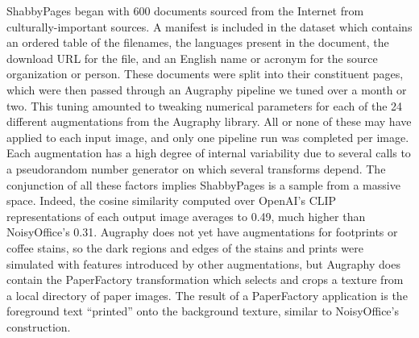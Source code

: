 \documentclass[runningheads]{llncs}
\begin{document}
ShabbyPages began with 600 documents sourced from the Internet from culturally-important sources.
A manifest is included in the dataset which contains an ordered table of the filenames, the languages present in the document, the download URL for the file, and an English name or acronym for the source organization or person.
These documents were split into their constituent pages, which were then passed through an Augraphy pipeline we tuned over a month or two.
This tuning amounted to tweaking numerical parameters for each of the 24 different augmentations from the Augraphy library.
All or none of these may have applied to each input image, and only one pipeline run was completed per image.
Each augmentation has a high degree of internal variability due to several calls to a pseudorandom number generator on which several transforms depend.
The conjunction of all these factors implies ShabbyPages is a sample from a massive space.
Indeed, the cosine similarity computed over OpenAI's CLIP representations of each output image averages to 0.49, much higher than NoisyOffice's 0.31.
Augraphy does not yet have augmentations for footprints or coffee stains, so the dark regions and edges of the stains and prints were simulated with features introduced by other augmentations, but Augraphy does contain the PaperFactory transformation which selects and crops a texture from a local directory of paper images.
The result of a PaperFactory application is the foreground text ``printed'' onto the background texture, similar to NoisyOffice's construction.



\end{document}
